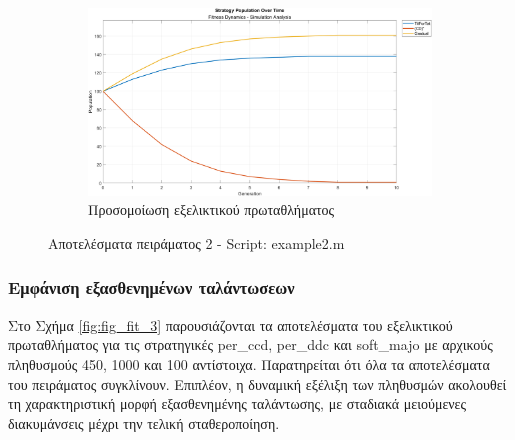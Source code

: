 \documentclass[12pt]{report}
\begin{document}
\begin{figure}[htbp]
    \hfill
    \begin{subfigure}[b]{0.5\linewidth}
        \centering
        \includegraphics[width=\linewidth]{Figures Fitness Dynamics/example2-sim.png}
        \caption{Προσομοίωση εξελικτικού πρωταθλήματος}
        \label{fig:fig_fit_2_c}
    \end{subfigure}

    \caption{Αποτελέσματα πειράματος 2 - \foreignlanguage{english}{Script: example2.m}}
    \label{fig:fig_fit_2}
\end{figure}


\subsubsection{Εμφάνιση εξασθενημένων ταλάντωσεων}
Στο Σχήμα \ref{fig:fig_fit_3} παρουσιάζονται τα αποτελέσματα του εξελικτικού πρωταθλήματος για τις στρατηγικές \foreignlanguage{english}{per\_ccd, per\_ddc} και \foreignlanguage{english}{soft\_majo} με αρχικούς πληθυσμούς 450, 1000 και 100 αντίστοιχα. Παρατηρείται ότι όλα τα αποτελέσματα του πειράματος συγκλίνουν. Επιπλέον, η δυναμική εξέλιξη των πληθυσμών ακολουθεί τη χαρακτηριστική μορφή εξασθενημένης ταλάντωσης, με σταδιακά μειούμενες διακυμάνσεις μέχρι την τελική σταθεροποίηση.
\end{document}
